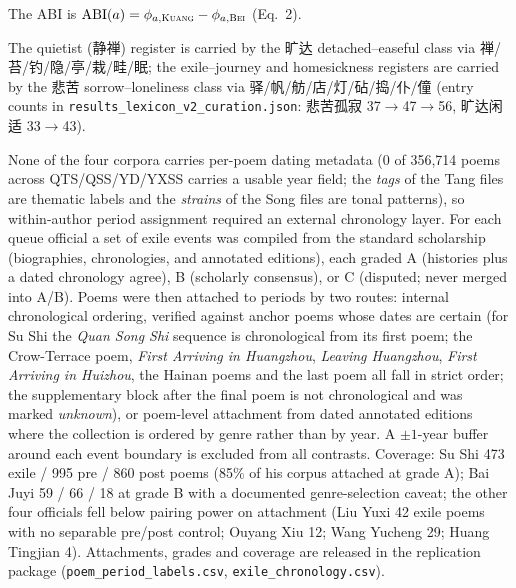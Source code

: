 \documentclass[11pt]{article}
\begin{document}
\noindent The ABI is
$\mathrm{ABI}(a)=\phi_{a,\textsc{Kuang}}-\phi_{a,\textsc{Bei}}$
(Eq.~2).

\begin{sloppypar}
\noindent The quietist (静禅) register is carried by the 旷达 detached--easeful
class via 禅/苔/钓/隐/亭/栽/畦/眠; the exile--journey and homesickness registers
are carried by the 悲苦 sorrow--loneliness class via 驿/帆/舫/店/灯/砧/捣/仆/僮
(entry counts in \texttt{results\_lexicon\_v2\_curation.json}: 悲苦孤寂
37$\to$47$\to$56, 旷达闲适 33$\to$43).
\end{sloppypar}

\label{app:chron}
None of the four corpora carries per-poem dating metadata (0 of 356{,}714 poems
across QTS/QSS/YD/YXSS carries a usable year field; the \emph{tags} of the Tang
files are thematic labels and the \emph{strains} of the Song files are tonal
patterns), so within-author period assignment required an external chronology
layer. For each queue official a set of exile events was compiled from the
standard scholarship (biographies, chronologies, and annotated editions), each
graded A (histories plus a dated chronology agree), B (scholarly consensus), or C
(disputed; never merged into A/B). Poems were then attached to periods by two
routes: internal chronological ordering, verified against anchor poems whose
dates are certain (for Su Shi the \emph{Quan Song Shi} sequence is chronological
from its first poem; the Crow-Terrace poem, \emph{First Arriving in Huangzhou},
\emph{Leaving Huangzhou}, \emph{First Arriving in Huizhou}, the Hainan poems and
the last poem all fall in strict order; the supplementary block after the final
poem is not chronological and was marked \emph{unknown}), or poem-level
attachment from dated annotated editions where the collection is ordered by
genre rather than by year. A $\pm1$-year buffer around each event boundary is
excluded from all contrasts. Coverage: Su Shi 473 exile / 995 pre / 860 post
poems (85\% of his corpus attached at grade A); Bai Juyi 59 / 66 / 18 at grade B
with a documented genre-selection caveat; the other four officials fell below
pairing power on attachment (Liu Yuxi 42 exile poems with no separable
pre/post control; Ouyang Xiu 12; Wang Yucheng 29; Huang Tingjian 4). Attachments, grades and coverage are released in
the replication package (\texttt{poem\_period\_labels.csv},
\texttt{exile\_chronology.csv}).

\label{app:goldrep}
\end{document}

